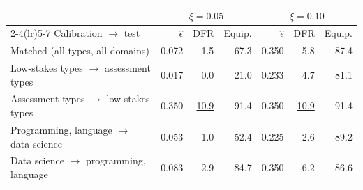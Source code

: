 \begin{tabular}{lrrrrrr}\toprule
& \multicolumn{3}{c}{$\xi=0.05$} & \multicolumn{3}{c}{$\xi=0.10$} \\ \cmidrule(lr){2-4}\cmidrule(lr){5-7}
Calibration $\to$ test & $\hat\epsilon$ & DFR & Equip. & $\hat\epsilon$ & DFR & Equip. \\ \midrule
Matched (all types, all domains) & 0.072 & 1.5 & 67.3 & 0.350 & 5.8 & 87.4 \\
Low-stakes types $\to$ assessment types & 0.017 & 0.0 & 21.0 & 0.233 & 4.7 & 81.1 \\
Assessment types $\to$ low-stakes types & 0.350 & \underline{10.9} & 91.4 & 0.350 & \underline{10.9} & 91.4 \\
Programming, language $\to$ data science & 0.053 & 1.0 & 52.4 & 0.225 & 2.6 & 89.2 \\
Data science $\to$ programming, language & 0.083 & 2.9 & 84.7 & 0.350 & 6.2 & 86.6 \\
\bottomrule\end{tabular}
